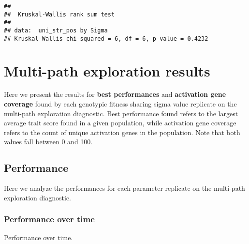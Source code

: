 \documentclass[]{book}
\newenvironment{Shaded}{\begin{snugshade}}{\end{snugshade}}
\newcommand{\DataTypeTok}[1]{\textcolor[rgb]{0.13,0.29,0.53}{#1}}
\newcommand{\KeywordTok}[1]{\textcolor[rgb]{0.13,0.29,0.53}{\textbf{#1}}}
\newcommand{\NormalTok}[1]{#1}
\newcommand{\OperatorTok}[1]{\textcolor[rgb]{0.81,0.36,0.00}{\textbf{#1}}}
\newcommand{\StringTok}[1]{\textcolor[rgb]{0.31,0.60,0.02}{#1}}
\begin{document}
\begin{verbatim}
## 
##  Kruskal-Wallis rank sum test
## 
## data:  uni_str_pos by Sigma
## Kruskal-Wallis chi-squared = 6, df = 6, p-value = 0.4232
\end{verbatim}

\hypertarget{multi-path-exploration-results-3}{%
\section{Multi-path exploration results}\label{multi-path-exploration-results-3}}

Here we present the results for \textbf{best performances} and \textbf{activation gene coverage} found by each genotypic fitness sharing sigma value replicate on the multi-path exploration diagnostic.
Best performance found refers to the largest average trait score found in a given population, while activation gene coverage refers to the count of unique activation genes in the population.
Note that both values fall between 0 and 100.

\hypertarget{performance-3}{%
\subsection{Performance}\label{performance-3}}

Here we analyze the performances for each parameter replicate on the multi-path exploration diagnostic.

\hypertarget{performance-over-time-10}{%
\subsubsection{Performance over time}\label{performance-over-time-10}}

Performance over time.

\begin{Shaded}
\end{Shaded}
\end{document}
